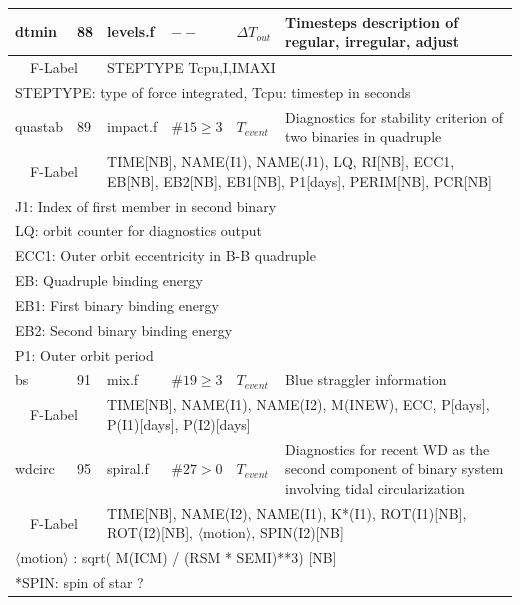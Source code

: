 \begin{longtable}{||p{0.42in}|p{0.25in}|p{0.6in}|p{0.6in}|p{0.4in}|p{2.3in}||}
  dtmin    & 88  & levels.f   & $--$   & $\Delta T_{out}$    & Timesteps description of regular, irregular, adjust  \\\hline
\multicolumn{2}{|c|}{ F-Label } & \multicolumn{4}{|p{4.4in}|}{ STEPTYPE Tcpu,I,IMAXI}\\ \hline
\multicolumn{6}{|p{5.4in}|}{STEPTYPE: type of force integrated, Tcpu: timestep in seconds} \\
\hline\hline

 quastab     & 89  & impact.f   & $\#15\geq3$  & $T_{event}$    & Diagnostics for stability criterion of two binaries in quadruple  \\\hline
\multicolumn{2}{|c|}{ F-Label } & \multicolumn{4}{|p{4.4in}|}{ TIME[NB], NAME(I1), NAME(J1), LQ, RI[NB], ECC1, EB[NB], EB2[NB], EB1[NB], P1[days], PERIM[NB], PCR[NB]} \\\hline
\multicolumn{6}{|p{5.4in}|}{ J1: Index of first member in second binary } \\
\multicolumn{6}{|p{5.4in}|}{ LQ: orbit counter for diagnostics output } \\
\multicolumn{6}{|p{5.4in}|}{ ECC1: Outer orbit eccentricity in B-B quadruple } \\
\multicolumn{6}{|p{5.4in}|}{ EB: Quadruple binding energy } \\
\multicolumn{6}{|p{5.4in}|}{ EB1: First binary binding energy } \\
\multicolumn{6}{|p{5.4in}|}{ EB2: Second binary binding energy } \\
\multicolumn{6}{|p{5.4in}|}{ P1: Outer orbit period} \\
\hline\hline

   bs      & 91  & mix.f      & $\#19\geq3$  & $T_{event}$    & Blue straggler information   \\\hline
\multicolumn{2}{|c|}{ F-Label } & \multicolumn{4}{|p{4.4in}|}{ TIME[NB], NAME(I1), NAME(I2), M(INEW), ECC, P[days], P(I1)[days], P(I2)[days]}  \\
\hline\hline

  wdcirc    & 95  & spiral.f   & $\#27>0$     & $T_{event}$    & Diagnostics for recent WD as the second component of binary system involving tidal circularization\\\hline
\multicolumn{2}{|c|}{ F-Label } & \multicolumn{4}{|p{4.4in}|}{TIME[NB], NAME(I2), NAME(I1), K*(I1), ROT(I1)[NB], ROT(I2)[NB], $\langle$motion$\rangle$, SPIN(I2)[NB] }\\\hline
\multicolumn{6}{|p{5.4in}|}{ $\langle$motion$\rangle$ : sqrt( M(ICM) / (RSM * SEMI)**3) [NB] } \\
\multicolumn{6}{|p{5.4in}|}{ *SPIN: spin of star ?} \\\hline
\hline\hline


\end{longtable}
